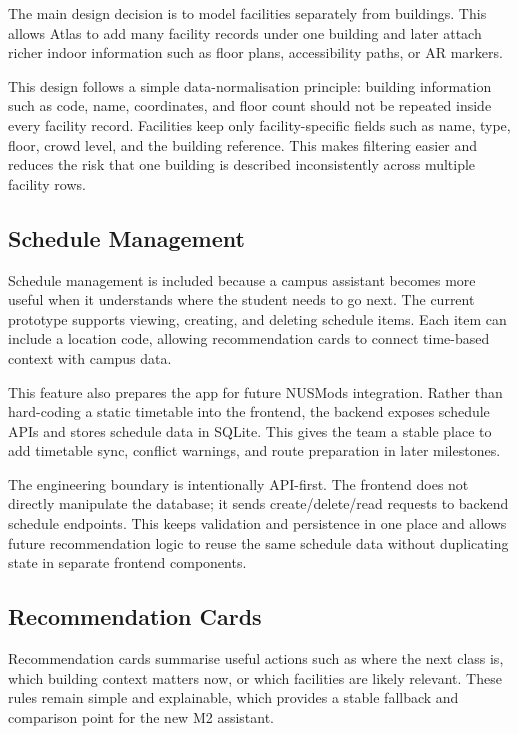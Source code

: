 \documentclass[11pt]{article}
\begin{document}
The main design decision is to model facilities separately from buildings. This allows Atlas to add many facility records under one building and later attach richer indoor information such as floor plans, accessibility paths, or AR markers.

This design follows a simple data-normalisation principle: building information such as code, name, coordinates, and floor count should not be repeated inside every facility record. Facilities keep only facility-specific fields such as name, type, floor, crowd level, and the building reference. This makes filtering easier and reduces the risk that one building is described inconsistently across multiple facility rows.

\subsection*{Schedule Management}

Schedule management is included because a campus assistant becomes more useful when it understands where the student needs to go next. The current prototype supports viewing, creating, and deleting schedule items. Each item can include a location code, allowing recommendation cards to connect time-based context with campus data.

This feature also prepares the app for future NUSMods integration. Rather than hard-coding a static timetable into the frontend, the backend exposes schedule APIs and stores schedule data in SQLite. This gives the team a stable place to add timetable sync, conflict warnings, and route preparation in later milestones.

The engineering boundary is intentionally API-first. The frontend does not directly manipulate the database; it sends create/delete/read requests to backend schedule endpoints. This keeps validation and persistence in one place and allows future recommendation logic to reuse the same schedule data without duplicating state in separate frontend components.

\subsection*{Recommendation Cards}

Recommendation cards summarise useful actions such as where the next class is, which building context matters now, or which facilities are likely relevant. These rules remain simple and explainable, which provides a stable fallback and comparison point for the new M2 assistant.
\end{document}
